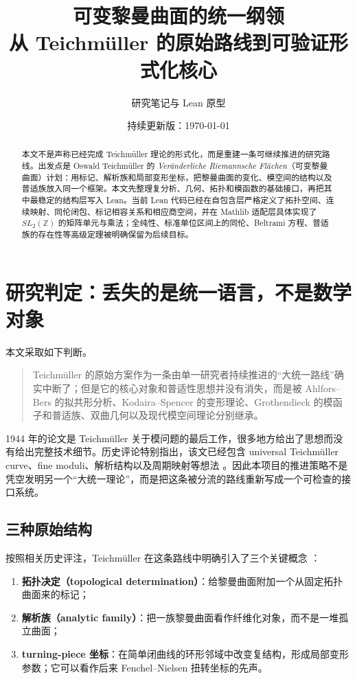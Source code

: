 \documentclass[UTF8,fontset=none,a4paper,11pt]{ctexart}
\title{\textbf{可变黎曼曲面的统一纲领}\texorpdfstring{\\}{：}从 Teichmüller 的原始路线到可验证形式化核心}
\author{研究笔记与 Lean 原型}
\date{持续更新版：\today}
\begin{document}
\maketitle

\begin{abstract}
本文不是声称已经完成 Teichmüller 理论的形式化，而是重建一条可继续推进的研究路线。出发点是 Oswald Teichmüller 的
\emph{Veränderliche Riemannsche Flächen}（可变黎曼曲面）计划：用标记、解析族和局部变形坐标，把黎曼曲面的变化、模空间的结构以及普适族放入同一个框架。本文先整理复分析、几何、拓扑和模函数的基础接口，再把其中最稳定的结构层写入 Lean。当前 Lean 代码已经在自包含层严格定义了拓扑空间、连续映射、同伦闭包、标记相容关系和相应商空间，并在 Mathlib 适配层具体实现了 $SL_2(\mathbb Z)$ 的矩阵单元与乘法；全纯性、标准单位区间上的同伦、Beltrami 方程、普适族的存在性等高级定理被明确保留为后续目标。
\end{abstract}

\tableofcontents

\section{研究判定：丢失的是统一语言，不是数学对象}

本文采取如下判断。

\begin{quote}
Teichmüller 的原始方案作为一条由单一研究者持续推进的“大统一路线”确实中断了；但是它的核心对象和普适性思想并没有消失，而是被 Ahlfors--Bers 的拟共形分析、Kodaira--Spencer 的变形理论、Grothendieck 的模函子和普适族、双曲几何以及现代模空间理论分别继承。
\end{quote}

1944 年的论文是 Teichmüller 关于模问题的最后工作，很多地方给出了思想而没有给出完整技术细节。历史评论特别指出，该文已经包含 universal Teichmüller curve、fine moduli、解析结构以及周期映射等想法 \cite{ACampo2012,ACampo2016}。因此本项目的推进策略不是凭空发明另一个“大统一理论”，而是把这条被分流的路线重新写成一个可检查的接口系统。

\subsection{三种原始结构}

按照相关历史评注，Teichmüller 在这条路线中明确引入了三个关键概念 \cite{ACampo2012}：

\begin{enumerate}[label=(\arabic*)]
  \item \textbf{拓扑决定（topological determination）}：给黎曼曲面附加一个从固定拓扑曲面来的标记；
  \item \textbf{解析族（analytic family）}：把一族黎曼曲面看作纤维化对象，而不是一堆孤立曲面；
  \item \textbf{turning-piece 坐标}：在简单闭曲线的环形邻域中改变复结构，形成局部变形参数；它可以看作后来 Fenchel--Nielsen 扭转坐标的先声。
\end{enumerate}
\end{document}
